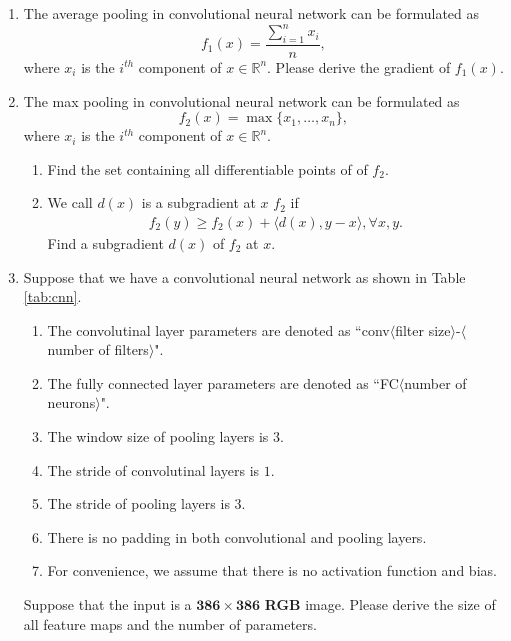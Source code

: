 \documentclass[11pt,letter,notitlepage]{article}
\begin{document}
\begin{exercise}
	\begin{enumerate}
		\item The average pooling in convolutional neural network can be formulated as
		      $$f_1(x)= \frac{\sum_{i=1}^n x_i}{n},$$
		      where $x_i$ is the $i^{th}$ component of $x\in\mathbb{R}^n$. Please derive the gradient of $f_1(x)$.
		\item The max pooling in convolutional neural network can be formulated as
		      $$f_2(x)= \max\{x_1,\dots,x_n\},$$
		      where $x_i$ is the $i^{th}$ component of $x\in\mathbb{R}^n$.
		      \begin{enumerate}
			      \item Find the set containing all differentiable points of of $f_2$.
			      \item We call $d(x)$ is a subgradient at $x$ $f_2$ if
			            \begin{align*}
				            f_2(y) \geq f_2(x) + \langle d(x),y-x \rangle, \forall x,y .
			            \end{align*}
			            Find a subgradient $d(x)$ of $f_2$ at $x$.
		      \end{enumerate}
		\item Suppose that we have a convolutional neural network as shown in Table \ref{tab:cnn}.
		      \begin{enumerate}
			      \item The convolutinal layer parameters are denoted as ``conv$\langle$filter size$\rangle$-$\langle$number of filters$\rangle$".
			      \item  The fully connected layer parameters are denoted as ``FC$\langle$number of neurons$\rangle$".
			      \item The window size of pooling layers is $3$.
			      \item The stride of convolutinal layers is $1$.
			      \item The stride of pooling layers is $3$.
			      \item There is no padding in both convolutional and pooling layers.
			      \item For convenience, we assume that there is no activation function and bias.
		      \end{enumerate}

		      Suppose that the input is a $\mathbf{386\times 386}$ \textbf{RGB} image. Please derive the size of all feature maps and the number of parameters.
	\end{enumerate}


\end{exercise}
\end{document}
